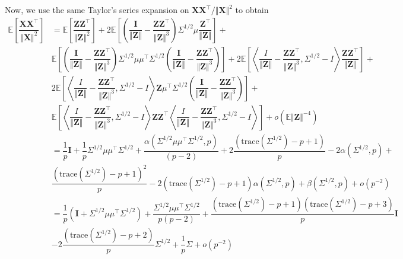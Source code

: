 \documentclass[11pt]{article}
\makeatletter
\def\E{\mathbb{E}}
\newcommand{\bb}[1]{\boldsymbol{#1}}
\newcommand{\tr}{^{\intercal}}
\theoremstyle{general}
\renewenvironment{proof}[1][\proofname]{\par
    \pushQED{\qed}%
    \normalfont \topsep6\p@\@plus6\p@\relax
    \trivlist
    \item\relax{
        \bfseries
        #1\@addpunct{.}}\hspace\labelsep\ignorespaces
    }{%
     \popQED\endtrivlist\@endpefalse
     }
\numberwithin{equation}{section}
\makeatother
\begin{document}
\begin{proof}
    Now, we use the same Taylor's series expansion on $\bb{X}\bb{X}\tr / \Vert \bb{X}\Vert^2$ to obtain
    \begin{align*}
        \E\left[ \dfrac{\bb{XX}\tr }{\Vert \bb{X}\Vert^2 } \right]
        & = \E\left[ \dfrac{\bb{ZZ}\tr }{\Vert \bb{Z}\Vert^2 } \right] + 2\E\left[ \left( \dfrac{\bb{I}}{\Vert \bb{Z}\Vert} - \dfrac{\bb{ZZ}\tr}{\Vert \bb{Z}\Vert^3} \right) \Sigma^{1/2}\mu \dfrac{\bb{Z}\tr}{\Vert \bb{Z}\Vert } \right] + \\
        & \E\left[ \left( \dfrac{\bb{I}}{\Vert \bb{Z}\Vert} - \dfrac{\bb{ZZ}\tr}{\Vert \bb{Z}\Vert^3} \right) \Sigma^{1/2}\mu\mu\tr \Sigma^{1/2} \left( \dfrac{\bb{I}}{\Vert \bb{Z}\Vert} - \dfrac{\bb{ZZ}\tr}{\Vert \bb{Z}\Vert^3} \right) \right] +
        2\E\left[ \left\langle \dfrac{I}{\Vert \bb{Z}\Vert } - \dfrac{\bb{Z}\bb{Z}\tr }{\Vert \bb{Z}\Vert^3}, \Sigma^{1/2} - I \right\rangle \dfrac{\bb{ZZ}\tr}{\Vert \bb{Z}\Vert } \right] +\\
        & 2\E\left[ \left\langle \dfrac{I}{\Vert \bb{Z}\Vert } - \dfrac{\bb{Z}\bb{Z}\tr }{\Vert \bb{Z}\Vert^3}, \Sigma^{1/2} - I \right\rangle \bb{Z}\mu\tr \Sigma^{1/2} \left( \dfrac{\bb{I}}{\Vert \bb{Z}\Vert} - \dfrac{\bb{ZZ}\tr}{\Vert \bb{Z}\Vert^3} \right) \right] + \\
        & \E\left[ \left\langle \dfrac{I}{\Vert \bb{Z}\Vert } - \dfrac{\bb{Z}\bb{Z}\tr }{\Vert \bb{Z}\Vert^3}, \Sigma^{1/2} - I \right\rangle \bb{ZZ}\tr \left\langle \dfrac{I}{\Vert \bb{Z}\Vert } - \dfrac{\bb{Z}\bb{Z}\tr }{\Vert \bb{Z}\Vert^3}, \Sigma^{1/2} - I \right\rangle \right] + o(\E\Vert \bb{Z}\Vert^{-4})\\
        & = \dfrac{1}{p}\bb{I} + \dfrac{1}{p} \Sigma^{1/2}\mu\mu\tr\Sigma^{1/2} + \dfrac{\alpha(\Sigma^{1/2}\mu\mu\tr\Sigma^{1/2}, p)}{(p-2)} + 2\dfrac{(\text{trace}(\Sigma^{1/2}) - p + 1)}{p} - 2\alpha(\Sigma^{1/2}, p) + \\
        & \dfrac{(\text{trace}(\Sigma^{1/2}) - p + 1)^2}{p} - 2(\text{trace}(\Sigma^{1/2}) - p + 1)\alpha(\Sigma^{1/2}, p) + \beta(\Sigma^{1/2}, p) + o(p^{-2})\\
        & = \dfrac{1}{p}(\bb{I} + \Sigma^{1/2}\mu\mu\tr \Sigma^{1/2}) + \dfrac{\Sigma^{1/2}\mu \mu\tr \Sigma^{1/2}}{p(p-2)} + \dfrac{(\text{trace}(\Sigma^{1/2}) - p + 1)(\text{trace}(\Sigma^{1/2}) - p + 3)}{p}\bb{I}\\
        & - 2\dfrac{(\text{trace}(\Sigma^{1/2}) - p + 2)}{p}\Sigma^{1/2} + \dfrac{1}{p}\Sigma + o(p^{-2})
    \end{align*}
\end{proof}


















\end{document}

